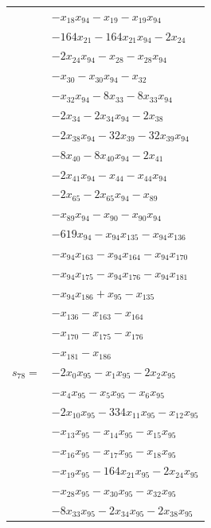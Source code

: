 \begin{longtable}{@{}r@{\;}l@{}}
 & \(\displaystyle -x_{18}x_{94} -x_{19} -x_{19}x_{94}\) \\
 & \(\displaystyle -164x_{21} -164x_{21}x_{94} -2x_{24}\) \\
 & \(\displaystyle -2x_{24}x_{94} -x_{28} -x_{28}x_{94}\) \\
 & \(\displaystyle -x_{30} -x_{30}x_{94} -x_{32}\) \\
 & \(\displaystyle -x_{32}x_{94} -8x_{33} -8x_{33}x_{94}\) \\
 & \(\displaystyle -2x_{34} -2x_{34}x_{94} -2x_{38}\) \\
 & \(\displaystyle -2x_{38}x_{94} -32x_{39} -32x_{39}x_{94}\) \\
 & \(\displaystyle -8x_{40} -8x_{40}x_{94} -2x_{41}\) \\
 & \(\displaystyle -2x_{41}x_{94} -x_{44} -x_{44}x_{94}\) \\
 & \(\displaystyle -2x_{65} -2x_{65}x_{94} -x_{89}\) \\
 & \(\displaystyle -x_{89}x_{94} -x_{90} -x_{90}x_{94}\) \\
 & \(\displaystyle -619x_{94} -x_{94}x_{135} -x_{94}x_{136}\) \\
 & \(\displaystyle -x_{94}x_{163} -x_{94}x_{164} -x_{94}x_{170}\) \\
 & \(\displaystyle -x_{94}x_{175} -x_{94}x_{176} -x_{94}x_{181}\) \\
 & \(\displaystyle -x_{94}x_{186} +x_{95} -x_{135}\) \\
 & \(\displaystyle -x_{136} -x_{163} -x_{164}\) \\
 & \(\displaystyle -x_{170} -x_{175} -x_{176}\) \\
 & \(\displaystyle -x_{181} -x_{186}\) \\[3pt]
\(s_{78}=\) & \(\displaystyle -2x_{0}x_{95} -x_{1}x_{95} -2x_{2}x_{95}\) \\
 & \(\displaystyle -x_{4}x_{95} -x_{5}x_{95} -x_{6}x_{95}\) \\
 & \(\displaystyle -2x_{10}x_{95} -334x_{11}x_{95} -x_{12}x_{95}\) \\
 & \(\displaystyle -x_{13}x_{95} -x_{14}x_{95} -x_{15}x_{95}\) \\
 & \(\displaystyle -x_{16}x_{95} -x_{17}x_{95} -x_{18}x_{95}\) \\
 & \(\displaystyle -x_{19}x_{95} -164x_{21}x_{95} -2x_{24}x_{95}\) \\
 & \(\displaystyle -x_{28}x_{95} -x_{30}x_{95} -x_{32}x_{95}\) \\
 & \(\displaystyle -8x_{33}x_{95} -2x_{34}x_{95} -2x_{38}x_{95}\) \\

\end{longtable}

